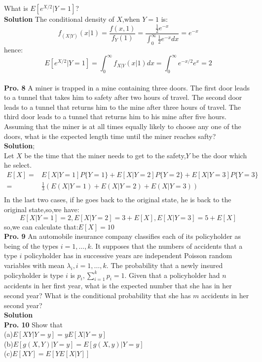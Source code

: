 \documentclass[12pt,onecolumn,journal]{IEEEtran}
\begin{document}
What is $E[e^{X/2}|Y=1]$?
\\
\textbf{Solution}
\textcolor[rgb]{1,0,0}
{
The conditional density of $X$,when $Y=1$ is:
\[f_{(X|Y)}(x|1)=\frac{f(x,1)}{f_Y(1)}=\frac{\frac{1}{2}e^{-x}}{\int_{0}^{\infty}\frac{1}{2}e^{-x}dx}=e^{-x}\]
hence:
\[E[e^{X/2}|Y=1]=\int_{0}^{\infty}f_{X|Y}(x|1)dx=\int_{0}^{\infty}e^{-x/2}e^x=2\]
}
\\
\textbf{Pro. 8} A miner is trapped in a mine containing three doors. The first door leads to a tunnel that takes him to safety after two hours of travel. The second door leads to a tunnel that returns him to the mine after three hours of travel. The third door leads to a tunnel that returns him to his mine after five hours. Assuming that the miner is at all times equally likely to choose any one of the doors, what is the expected length time until the miner reaches safty?
\\
\textbf{Solution};
\\
\textcolor[rgb]{1,0,0}
{
Let $X$ be the time that the miner needs to get to the safety,$Y$ be the door which he select.
\[
\begin{aligned}
E[X]=&E[X|Y=1]P\{Y=1\}+E[X|Y=2]P\{Y=2\}+E[X|Y=3]P\{Y=3\}&\\
=&\frac{1}{3}(E(X|Y=1)+E(X|Y=2)+E(X|Y=3))&\\
\end{aligned}
\]
In the last two cases, if he goes back to the original state, he is back to the original state,so,we have:
\[E[X|Y=1]=2,E[X|Y=2]=3+E[X],E[X|Y=3]=5+E[X]\]
so,we can calculate that:$E[X]=10$
}
\\
\textbf{Pro. 9} An automobile insurance company classifies each of its policyholder as being of the types $i=1,\ldots,k$. It supposes that the numbers of accidents that a type $i$ policyholder has in successive years are independent Poisson random variables with mean $\lambda_i,i=1,\ldots,k$. The probability that a newly insured policyholder is type $i$ is $p_i,\sum^k_{i=1}{p_i}=1$. Given that a policyholder had $n$ accidents in her first year, what is the expected number that she has in her second year? What is the conditional probability that she has $m$ accidents in her second year?\\
\textbf{Solution}
\\
\textbf{Pro. 10} Show that\\
\quad\quad(a)$E[XY|Y=y]=yE[X|Y=y]$\\
\quad\quad(b)$ E[g(X,Y)|Y=y]=E[g(X,y)|Y=y]$\\
\quad\quad(c)$ E[XY]=E[YE[X|Y]]$\\
\end{document}
